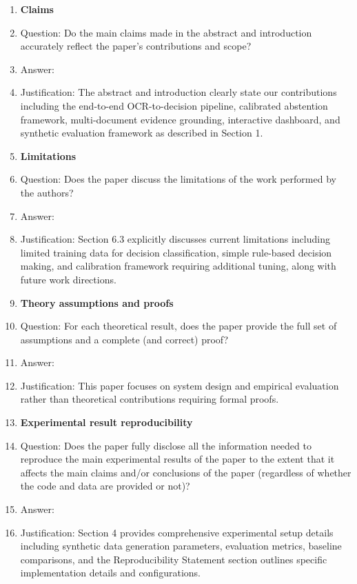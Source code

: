 \documentclass{article}
\begin{document}
\begin{enumerate}

\item {\bf Claims}
    \item[] Question: Do the main claims made in the abstract and introduction accurately reflect the paper's contributions and scope?
    \item[] Answer: \answerYes{}
    \item[] Justification: The abstract and introduction clearly state our contributions including the end-to-end OCR-to-decision pipeline, calibrated abstention framework, multi-document evidence grounding, interactive dashboard, and synthetic evaluation framework as described in Section 1.

\item {\bf Limitations}
    \item[] Question: Does the paper discuss the limitations of the work performed by the authors?
    \item[] Answer: \answerYes{}
    \item[] Justification: Section 6.3 explicitly discusses current limitations including limited training data for decision classification, simple rule-based decision making, and calibration framework requiring additional tuning, along with future work directions.

\item {\bf Theory assumptions and proofs}
    \item[] Question: For each theoretical result, does the paper provide the full set of assumptions and a complete (and correct) proof?
    \item[] Answer: \answerNA{}
    \item[] Justification: This paper focuses on system design and empirical evaluation rather than theoretical contributions requiring formal proofs.

    \item {\bf Experimental result reproducibility}
    \item[] Question: Does the paper fully disclose all the information needed to reproduce the main experimental results of the paper to the extent that it affects the main claims and/or conclusions of the paper (regardless of whether the code and data are provided or not)?
    \item[] Answer: \answerYes{}
    \item[] Justification: Section 4 provides comprehensive experimental setup details including synthetic data generation parameters, evaluation metrics, baseline comparisons, and the Reproducibility Statement section outlines specific implementation details and configurations.


\end{enumerate}
\end{document}
